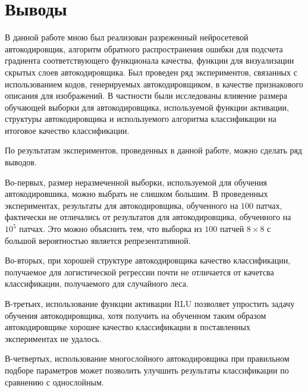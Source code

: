 \documentclass[12pt]{article}
\begin{document}
	\section{Выводы}
		\hspace{0.6cm}В данной работе мною был реализован разреженный нейросетевой автокодировщик, алгоритм обратного распространения ошибки для подсчета градиента соответствующего функционала качества, функции для визуализации скрытых слоев автокодировщика. Был проведен ряд экспериментов, связанных с использованием кодов, генерируемых автокодировщиком, в качестве признакового описания для изображений. В частности были исследованы влияение размера обучающей выборки для автокодировщика, используемой функции активации, структуры автокодировщика и используемого алгоритма классификации на итоговое качество классификации. 

		По результатам экспериментов, проведенных в данной работе, можно сделать ряд выводов.

		Во-первых, размер неразмеченной выборки, используемой для обучения автокодировшика, можно выбрать не слишком большим. В проведенных экспериментах, результаты для автокодировщика, обученного на $100$ патчах, фактически не отличались от результатов для автокодировщика, обученного на $10^5$ патчах. Это можно объяснить тем, что выборка из $100$ патчей $8 \times 8$ с большой вероятностью является репрезентативной.

		Во-вторых, при хорошей структуре автокодировщика качество классификации, получаемое для логистической регрессии почти не отличается от качетсва классификации, получаемого для случайного леса.

		В-третьих, использование функции активации RLU позволяет упростить задачу обучения автокодировщика, хотя получить на обученном таким образом автокодировщике хорошее качество классификации в поставленных экспериментах не удалось.

		В-четвертых, использование многослойного автокодировщика при правильном подборе параметров может позволить улучшить результаты классификации по сравнению с однослойным.
\end{document}
